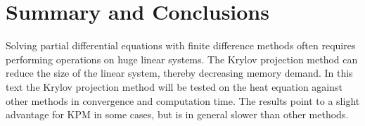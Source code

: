 \section*{Summary and Conclusions}
Solving partial differential equations with finite difference methods often requires performing operations on huge linear systems. The Krylov projection method can reduce the size of the linear system, thereby decreasing memory demand. In this text the Krylov projection method will be tested on the heat equation against other methods in convergence and computation time. The results point to a slight advantage for KPM in some cases, but is in general slower than other methods. 
